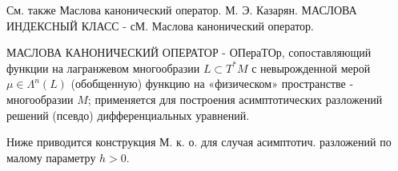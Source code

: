 \documentclass[10pt]{article}
\begin{document}
См. также Маслова канонический оператор. М. Э. Казарян. МАСЛОВА ИНДЕКСНЫЙ КЛАСС - сМ. Маслова канонический оператор.



МАСЛОВА КАНОНИЧЕСКИЙ ОПЕРАТОР - ОПераТОр, сопоставляющий функции на лагранжевом многообразии $L \subset T^{*} M$ с невырожденной мерой $\mu \in \Lambda^{n}(L)$ (обобщенную) функцию на «физическом» пространстве - многообразии $M$; применяется для построения асимптотических разложений решений (псевдо) дифференциальных уравнений.



Ниже приводится конструкция М. к. о. для случая асимптотич. разложений по малому параметру $h>0$.
\end{document}
